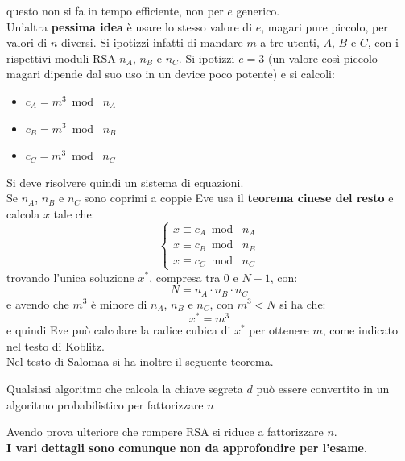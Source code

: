 \documentclass[a4paper,12pt, oneside]{book}
\begin{document}
questo non si fa in tempo efficiente, non per $e$ generico.\\
Un'altra \textbf{pessima idea} è usare lo stesso valore di $e$, magari pure
piccolo, per valori di $n$ diversi. Si ipotizzi infatti di mandare $m$ a tre
utenti, $A$, $B$ e $C$, con i rispettivi moduli RSA $n_A$, $n_B$ e $n_C$. Si
ipotizzi $e=3$ (un valore così piccolo magari dipende dal suo uso in un device
poco potente) e si calcoli:
\begin{itemize}
  \item $c_A=m^3\bmod \,\,n_A$
  \item $c_B=m^3\bmod \,\,n_B$
  \item $c_C=m^3\bmod \,\,n_C$
\end{itemize}
Si deve risolvere quindi un sistema di equazioni.\\
Se $n_A$, $n_B$ e $n_C$ sono coprimi a coppie Eve usa il \textbf{teorema cinese
  del resto} e calcola $x$ tale che:
\[
  \begin{cases}
    x\equiv c_A\bmod\,\,n_A\\
    x\equiv c_B\bmod\,\,n_B\\
    x\equiv c_C\bmod\,\,n_C  
  \end{cases}
\]
trovando l'unica soluzione $x^*$, compresa tra 0 e $N-1$, con:
\[N=n_A\cdot n_B\cdot n_C\]
e avendo che $m^3$ è minore di $n_A$, $n_B$ e $n_C$, con $m^3<N$ si ha che:
\[x^*=m^3\]
e quindi Eve può calcolare la radice cubica di $x^*$ per ottenere $m$, come
indicato nel testo di Koblitz.\\
Nel testo di Salomaa si ha inoltre il seguente teorema.
\begin{teorema}
  Qualsiasi algoritmo che calcola la chiave segreta $d$ può essere convertito in
  un algoritmo probabilistico per fattorizzare $n$ 
\end{teorema}
Avendo prova ulteriore che rompere RSA si riduce a fattorizzare $n$.\\
\textbf{I vari dettagli sono comunque non da approfondire per l'esame}.
\end{document}
